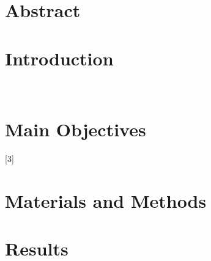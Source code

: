 \documentclass[a0,portrait]{a0poster}
\begin{document}
\begin{multicols}{2} %
\large
\section*{Abstract}
\blindtext

\section*{Introduction}
\blindtext ~\citep{Reynolds2012a}

\section*{Main Objectives}

[3]

\section*{Materials and Methods}
\blindtext

\section*{Results}



\end{multicols}
\end{document}
